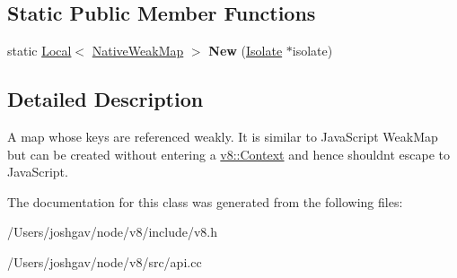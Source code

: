 \subsection*{Static Public Member Functions}
\begin{DoxyCompactItemize}
\item 
static \hyperlink{classv8_1_1_local}{Local}$<$ \hyperlink{classv8_1_1_native_weak_map}{Native\+Weak\+Map} $>$ {\bfseries New} (\hyperlink{classv8_1_1_isolate}{Isolate} $\ast$isolate)\hypertarget{classv8_1_1_native_weak_map_af59b34fd9c1a4e1488fdf7f0709880e6}{}\label{classv8_1_1_native_weak_map_af59b34fd9c1a4e1488fdf7f0709880e6}

\end{DoxyCompactItemize}


\subsection{Detailed Description}
A map whose keys are referenced weakly. It is similar to Java\+Script Weak\+Map but can be created without entering a \hyperlink{classv8_1_1_context}{v8\+::\+Context} and hence shouldn\textquotesingle{}t escape to Java\+Script. 

The documentation for this class was generated from the following files\+:\begin{DoxyCompactItemize}
\item 
/\+Users/joshgav/node/v8/include/v8.\+h\item 
/\+Users/joshgav/node/v8/src/api.\+cc\end{DoxyCompactItemize}
